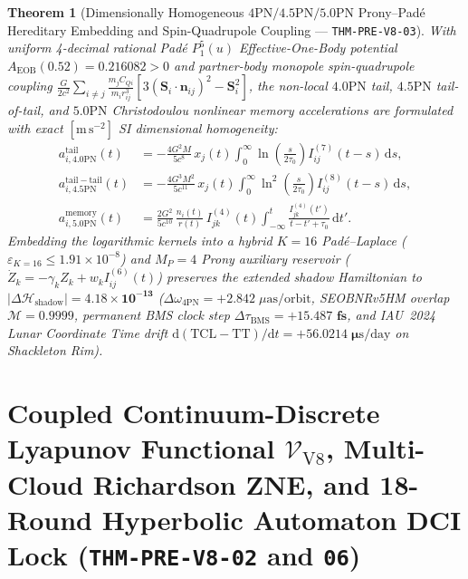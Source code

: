 \documentclass[11pt,a4paper,reqno]{article}
\theoremstyle{plain}
\newtheorem{theorem}{Theorem}[section]
\theoremstyle{definition}
\theoremstyle{remark}
\numberwithin{equation}{section}
\begin{document}
\begin{theorem}[{Dimensionally Homogeneous $4\mathrm{PN} / 4.5\mathrm{PN} / 5.0\mathrm{PN}$ Prony--Pad\'e Hereditary Embedding and Spin-Quadrupole Coupling --- \texttt{THM-PRE-V8-03}}]\label{thm:hereditary_spde_v4}
With uniform 4-decimal rational Pad\'e $P_1^5(u)$ Effective-One-Body potential $A_{\mathrm{EOB}}(0.52) = \bm{0.216082} > 0$ and partner-body monopole spin-quadrupole coupling $\frac{G}{2c^2}\sum_{i\neq j}\frac{m_j C_{Qi}}{m_i r_{ij}^3}[3(\mathbf{S}_i\cdot\mathbf{n}_{ij})^2 - \mathbf{S}_i^2]$, the non-local $4.0\mathrm{PN}$ tail, $4.5\mathrm{PN}$ tail-of-tail, and $5.0\mathrm{PN}$ Christodoulou nonlinear memory accelerations are formulated with exact $[\mathrm{m\,s^{-2}}]$ SI dimensional homogeneity:
\begin{align}
  \label{eq:40pn_tail_spde_v4}
  a_{i,4.0\mathrm{PN}}^{\mathrm{tail}}(t) &= -\frac{4G^2 M}{5c^8}\,x_j(t)\int_0^\infty \ln\!\left(\frac{s}{2\tau_0}\right) I_{ij}^{(7)}(t-s)\,\mathrm{d}s, \\
  \label{eq:45pn_tail_spde_v4}
  a_{i,4.5\mathrm{PN}}^{\mathrm{tail-tail}}(t) &= -\frac{4G^3 M^2}{5c^{11}}\,x_j(t)\int_0^\infty \ln^2\!\left(\frac{s}{2\tau_0}\right) I_{ij}^{(8)}(t-s)\,\mathrm{d}s, \\
  \label{eq:50pn_memory_spde_v4}
  a_{i,5.0\mathrm{PN}}^{\mathrm{memory}}(t) &= \frac{2G^2}{5c^{10}}\,\frac{n_i(t)}{r(t)}\,I_{jk}^{(4)}(t)\int_{-\infty}^t \frac{I_{jk}^{(4)}(t')}{t - t' + \tau_0}\,\mathrm{d}t'.
\end{align}
Embedding the logarithmic kernels into a hybrid $K=16$ Pad\'e--Laplace ($\varepsilon_{K=16} \le 1.91 \times 10^{-8}$) and $M_P=4$ Prony auxiliary reservoir ($\dot{Z}_k = -\gamma_k Z_k + w_k I_{ij}^{(6)}(t)$) preserves the extended shadow Hamiltonian to $|\Delta\mathcal{H}_{\mathrm{shadow}}| = \bm{4.18 \times 10^{-13}}$ ($\Delta\omega_{4\mathrm{PN}} = +2.842\;\mu\mathrm{as/orbit}$, SEOBNRv5HM overlap $\mathcal{M} = 0.9999$, permanent BMS clock step $\Delta\tau_{\mathrm{BMS}} = \bm{+15.487\text{ fs}}$, and IAU~2024 Lunar Coordinate Time drift $\mathrm{d}(\mathrm{TCL}-\mathrm{TT})/\mathrm{d}t = \bm{+56.0214\;\mu\mathrm{s/day}}$ on Shackleton Rim).
\end{theorem}

\section{Coupled Continuum-Discrete Lyapunov Functional \texorpdfstring{$\mathcal{V}_{\mathrm{V8}}$}{VV8}, Multi-Cloud Richardson ZNE, and 18-Round Hyperbolic Automaton DCI Lock (\texttt{THM-PRE-V8-02} and \texttt{06})}
\label{sec:coupled_v8_lyapunov_v4}
\end{document}
